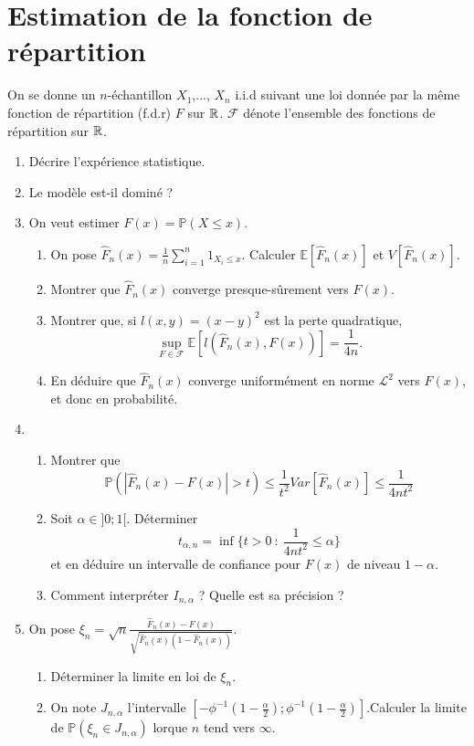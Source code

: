 \section{Estimation de la fonction de répartition}

On se donne un $n$-échantillon $X_1$,..., $X_n$ i.i.d suivant une loi donnée par la même fonction de répartition (f.d.r) $F$ sur $\mathbb R$. $\mathcal F$ dénote l'ensemble des fonctions de répartition sur $\mathbb R$.

\begin{enumerate}
\item Décrire l'expérience statistique.
\item Le modèle est-il dominé ?
\item On veut estimer $F(x)=\mathbb P(X\leq x)$.
	\begin{enumerate}
	\item On pose $\hat F_n(x)=\frac{1}{n}\sum_{i=1}^n 1_{X_i\leq x}$. Calculer $\mathbb E[\hat F_n(x)]$ et $V[\hat F_n(x)]$.
	\item Montrer que $\hat F_n(x)$ converge presque-sûrement vers $F(x)$.
	\item Montrer que, si $l(x,y)=(x-y)^2$ est la perte quadratique, \[\sup_{F\in \mathcal F} \mathbb E[l(\hat F_n(x),F(x))]=\frac{1}{4n}.\]
	\item En déduire que $\hat F_n(x)$ converge uniformément en norme $\mathcal L^2$ vers $F(x)$, et donc en probabilité.
	\end{enumerate}
\item \begin{enumerate}
	\item Montrer que \[\mathbb P(|\hat F_n(x) - F(x)|>t)\leq \frac{1}{t^2}Var[\hat F_n (x)]\leq \frac{1}{4nt^2}\]
	\item Soit $\alpha\in ]0;1[$. Déterminer 
	\[t_{\alpha,n}=\inf \{t>0 \ : \ \frac{1}{4nt^2}\leq \alpha\}\]
	et en déduire un intervalle de confiance pour $F(x)$ de niveau $1-\alpha$.
	\item Comment interpréter $I_{n,\alpha}$ ? Quelle est sa précision ?
	\end{enumerate}
\item On pose $\xi_n = \sqrt{n}\frac{\hat F_n(x) - F(x)}{\sqrt{\hat F_n(x)(1-\hat F_n(x))}}$.
	\begin{enumerate}
	\item Déterminer la limite en loi de $\xi_n$.
	\item On note $J_{n,\alpha}$ l'intervalle $[-\phi^{-1}(1-\frac{\alpha}{2});\phi^{-1}(1-\frac{\alpha}{2})]$.Calculer la limite de $\mathbb P(\xi_n\in J_{n,\alpha})$ lorque $n$ tend vers $\infty$.

\end{enumerate}
\end{enumerate}
